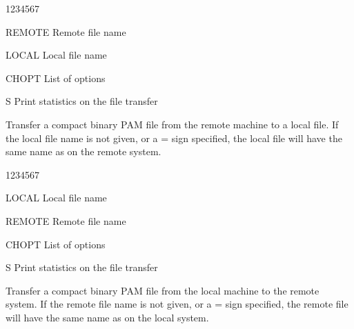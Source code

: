\begin{DLtt}{1234567}
\item[REMOTE]Remote file name
\item[LOCAL]Local file name
\item[CHOPT]List of options
\begin{DLtt}{12}
\item[S]Print statistics on the file transfer
\end{DLtt}
\end{DLtt}
Transfer a compact binary PAM
file from the remote machine to a local file.
If the local file name is not given, or a = sign specified,
the local file will have the same name as on the remote system.

\begin{DLtt}{1234567}
\item[LOCAL]Local file name
\item[REMOTE]Remote file name
\item[CHOPT]List of options
\begin{DLtt}{12}
\item[S]Print statistics on the file transfer
\end{DLtt}
\end{DLtt}
Transfer a compact binary PAM
file from the local machine to the remote system.
If the remote file name is not given, or a = sign specified,
the remote file will have the same name as on the local system.

